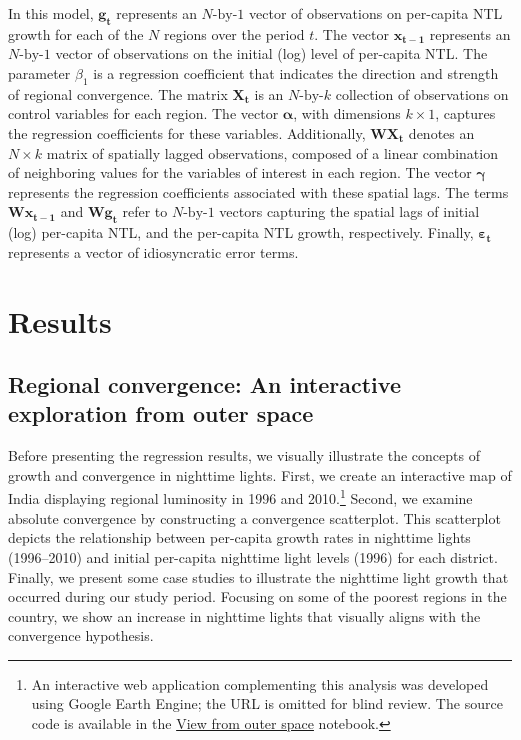 \documentclass[
  a4paper, 
  twoside,
  review
]{article}
\newcounter{code}
\begin{document}
In this model, \(\boldsymbol{g_t}\) represents an \(N\text{-by-}1\)
vector of observations on per-capita NTL growth for each of the \(N\)
regions over the period \(t\). The vector \(\boldsymbol{x_{t-1}}\)
represents an \(N\text{-by-}1\) vector of observations on the initial
(log) level of per-capita NTL. The parameter \(\beta_1\) is a regression
coefficient that indicates the direction and strength of regional
convergence. The matrix \(\boldsymbol{X_t}\) is an \(N\text{-by-}k\)
collection of observations on control variables for each region. The
vector \(\boldsymbol{\alpha}\), with dimensions \(k \times 1\), captures
the regression coefficients for these variables. Additionally,
\(\boldsymbol{W}\boldsymbol{X_t}\) denotes an \(N \times k\) matrix of
spatially lagged observations, composed of a linear combination of
neighboring values for the variables of interest in each region. The
vector \(\boldsymbol{\gamma}\) represents the regression coefficients
associated with these spatial lags. The terms
\(\boldsymbol{W} \boldsymbol{x_{t-1}}\) and
\(\boldsymbol{W} \boldsymbol{g_t}\) refer to \(N\text{-by-}1\) vectors
capturing the spatial lags of initial (log) per-capita NTL, and the
per-capita NTL growth, respectively. Finally,
\(\boldsymbol{\varepsilon_t}\) represents a vector of idiosyncratic
error terms.

\section{Results}\label{results}

\subsection{Regional convergence: An interactive exploration from outer
space}\label{regional-convergence-an-interactive-exploration-from-outer-space}

Before presenting the regression results, we visually illustrate the
concepts of growth and convergence in nighttime lights. First, we create
an interactive map of India displaying regional luminosity in 1996 and
2010.\footnote{An interactive web application complementing this
  analysis was developed using Google Earth Engine; the URL is omitted
  for blind review. The source code is available in the
  \href{notebooks/c01_view_from_space.ipynb}{View from outer space}
  notebook.} Second, we examine absolute convergence by constructing a
convergence scatterplot. This scatterplot depicts the relationship
between per-capita growth rates in nighttime lights (1996--2010) and
initial per-capita nighttime light levels (1996) for each district.
Finally, we present some case studies to illustrate the nighttime light
growth that occurred during our study period. Focusing on some of the
poorest regions in the country, we show an increase in nighttime lights
that visually aligns with the convergence hypothesis.
\end{document}
